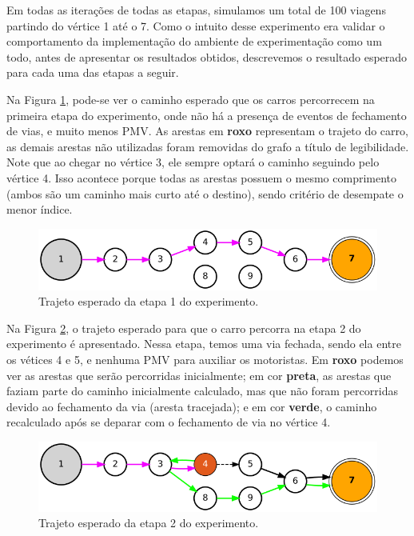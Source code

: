Em todas as iterações de todas as etapas, simulamos um total de 100 viagens partindo do vértice 1 até o 7.
Como o intuito desse experimento era validar o comportamento da implementação do ambiente de experimentação como um todo, antes de apresentar os resultados obtidos, descrevemos o resultado esperado para
cada uma das etapas a seguir.

Na Figura \ref{fig:mapa_etapa1}, pode-se ver o caminho esperado que os carros percorrecem na primeira etapa do experimento, onde não há a presença de eventos de fechamento de vias, e muito menos PMV.
As arestas em \textbf{roxo} representam o trajeto do carro, as demais arestas não utilizadas foram removidas do grafo a título de legibilidade.
Note que ao chegar no vértice 3, ele sempre optará o caminho seguindo pelo vértice 4.
Isso acontece porque todas as arestas possuem o mesmo comprimento (ambos são um caminho mais curto até o destino), sendo critério de desempate o menor índice.

\begin{figure}[ht]
	\centering
	\includegraphics[width=\textwidth]{figuras/mapa_etapa1.png}
	\caption{Trajeto esperado da etapa 1 do experimento.}
	\label{fig:mapa_etapa1}
\end{figure}

Na Figura \ref{fig:mapa_etapa2}, o trajeto esperado para que o carro percorra na etapa 2 do experimento é apresentado.
Nessa etapa, temos uma via fechada, sendo ela entre os vétices 4 e 5, e nenhuma PMV para auxiliar os motoristas.
Em \textbf{roxo} podemos ver as arestas que serão percorridas inicialmente;
em cor \textbf{preta}, as arestas que faziam parte do caminho inicialmente calculado, mas que não foram percorridas devido ao fechamento da via (aresta tracejada);
e em cor \textbf{verde}, o caminho recalculado após se deparar com o fechamento de via no vértice 4.

\begin{figure}[ht]
	\centering
	\includegraphics[width=\textwidth]{figuras/mapa_etapa2.png}
	\caption{Trajeto esperado da etapa 2 do experimento.}
	\label{fig:mapa_etapa2}
\end{figure}


